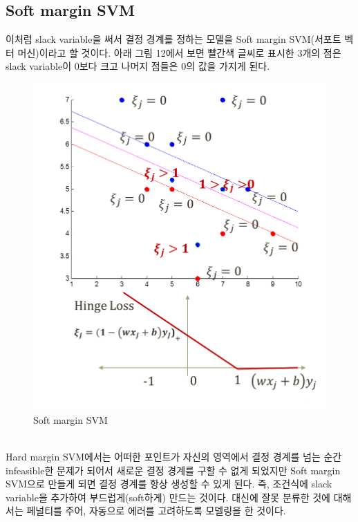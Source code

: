 \documentclass[a4paper]{oblivoir}
\begin{document}
\subsection{Soft margin SVM}
\indent 이처럼 slack variable을 써서 결정 경계를 정하는 모델을 Soft margin SVM(서포트 벡터 머신)이라고 할 것이다. 아래 그림 12에서 보면 빨간색 글씨로 표시한 3개의 점은 slack variable이 0보다 크고 나머지 점들은 0의 값을 가지게 된다.\\
\begin{figure}[ht]\centering
\includegraphics[scale=0.5]{SoftMargin}\caption{Soft margin SVM}\label{Fig:5-12}
\end{figure}\\
\indent Hard margin SVM에서는 어떠한 포인트가 자신의 영역에서 결정 경계를 넘는 순간 infeasible한 문제가 되어서 새로운 결정 경계를 구할 수 없게 되었지만 Soft margin SVM으로 만들게 되면 결정 경계를 항상 생성할 수 있게 된다. 즉, 조건식에 slack variable을 추가하여 부드럽게(soft하게) 만드는 것이다. 대신에 잘못 분류한 것에 대해서는 페널티를 주어, 자동으로 에러를 고려하도록 모델링을 한 것이다.

\end{document}
